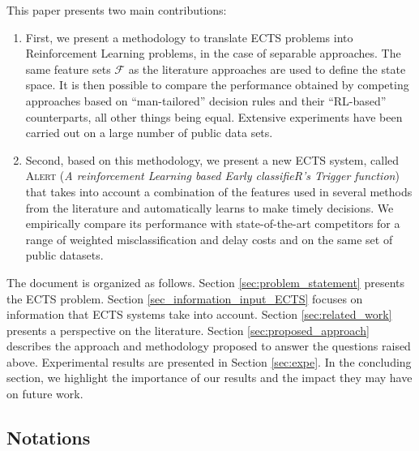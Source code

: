 \documentclass[sigconf, nonacm, table]{acmart}
\begin{document}
\smallskip
This paper presents two main contributions:
\begin{enumerate}
    \item First, we present a methodology to translate ECTS problems into Reinforcement Learning problems, in the case of separable approaches. The same feature sets $\mathcal{F}$ as the literature approaches are used to define the state space. It is then possible to compare the performance obtained by competing approaches based on ``man-tailored'' decision rules and their ``RL-based'' counterparts, all other things being equal. Extensive experiments have been carried out on a large number of public data sets. %

    \item Second, based on this methodology, we present a new ECTS system, called \textsc{Alert} (\textit{A reinforcement Learning based Early classifieR's Trigger function}) that takes into account a combination of the features used in several methods from the literature and automatically learns to make timely decisions. We empirically compare its performance with state-of-the-art competitors for a range of weighted misclassification and delay costs and on the same set of public datasets.
\end{enumerate} 










The document is organized as follows.
Section \ref{sec:problem_statement} presents the ECTS problem. 
Section \ref{sec_information_input_ECTS} focuses on information that ECTS systems take into account. 
Section \ref{sec:related_work} presents a perspective on the literature.  
Section \ref{sec:proposed_approach} describes the approach and methodology proposed to answer the questions raised above. 
Experimental results are presented in Section \ref{sec:expe}.
In the concluding section, we highlight the importance of our results and the impact they may have on future work.

\subsection*{Notations}
\end{document}
